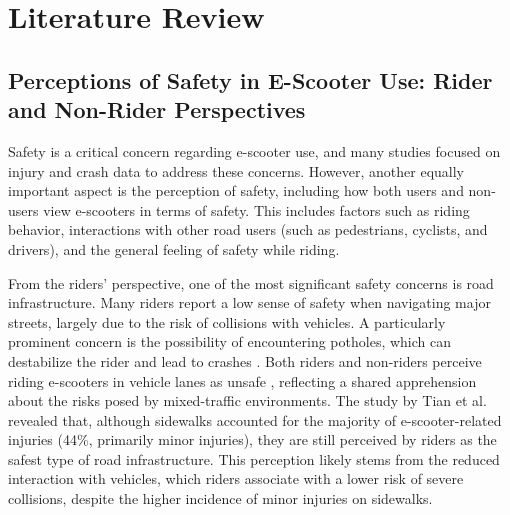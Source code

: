 \section{Literature Review}
\label{sec:literature}


\subsection{Perceptions of Safety in E-Scooter Use: Rider and Non-Rider Perspectives}
Safety is a critical concern regarding e-scooter use, and many studies focused on injury and crash data to address these concerns. However, another equally important aspect is the perception of safety, including how both users and non-users view e-scooters in terms of safety. This includes factors such as riding behavior, interactions with other road users (such as pedestrians, cyclists, and drivers), and the general feeling of safety while riding.

From the riders' perspective, one of the most significant safety concerns is road infrastructure. Many riders report a low sense of safety when navigating major streets, largely due to the risk of collisions with vehicles. A particularly prominent concern is the possibility of encountering potholes, which can destabilize the rider and lead to crashes \cite{sievert2023survey}. Both riders and non-riders perceive riding e-scooters in vehicle lanes as unsafe \cite{pourfalatoun2023shared}, reflecting a shared apprehension about the risks posed by mixed-traffic environments.
The study by Tian et al. \cite{tian2022characteristics} revealed that, although sidewalks accounted for the majority of e-scooter-related injuries (44\%, primarily minor injuries), they are still perceived by riders as the safest type of road infrastructure. This perception likely stems from the reduced interaction with vehicles, which riders associate with a lower risk of severe collisions, despite the higher incidence of minor injuries on sidewalks.

